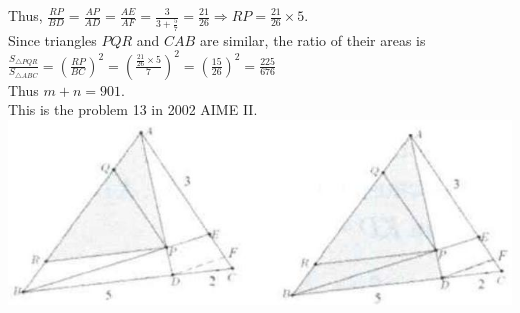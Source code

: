 \documentclass{article}
\begin{document}
Thus, \(\frac{R P}{B D}=\frac{A P}{A D}=\frac{A E}{A F}=\frac{3}{3+\frac{5}{7}}=\frac{21}{26} \Rightarrow R P=\frac{21}{26} \times 5\).\\
Since triangles \(P Q R\) and \(C A B\) are similar, the ratio of their areas is\\
\(\frac{S_{\triangle P Q R}}{S_{\triangle A B C}}=\left(\frac{R P}{B C}\right)^{2}=\left(\frac{\frac{21}{26} \times 5}{7}\right)^{2}=\left(\frac{15}{26}\right)^{2}=\frac{225}{676}\)\\
Thus \(m+n=901\).\\
This is the problem 13 in 2002 AIME II.\\
\centering
\includegraphics[width=\textwidth]{images/123(2).jpg}
\end{document}
